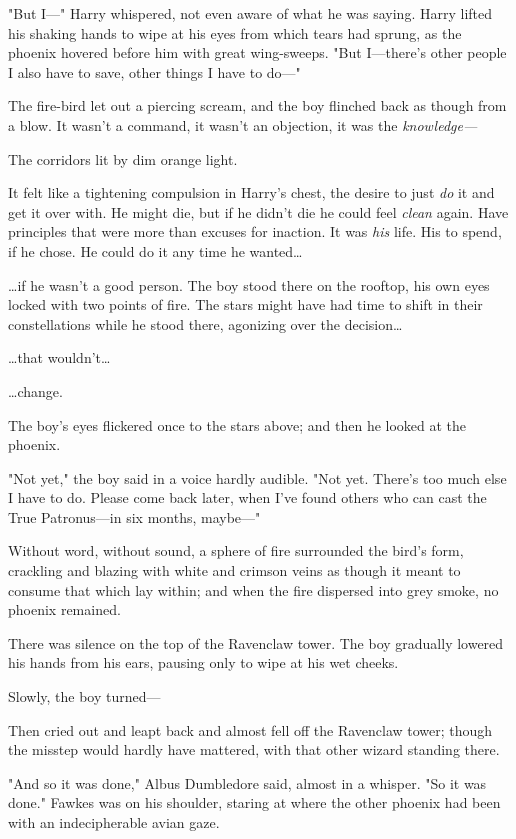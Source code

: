 "But I---" Harry whispered, not even aware of what he was saying. Harry lifted
his shaking hands to wipe at his eyes from which tears had sprung, as the
phoenix hovered before him with great wing-sweeps. "But I---there's other
people I also have to save, other things I have to do---"

The fire-bird let out a piercing scream, and the boy flinched back as though
from a blow. It wasn't a command, it wasn't an objection, it was the
\emph{knowledge---}

The corridors lit by dim orange light.

It felt like a tightening compulsion in Harry's chest, the desire to just
\emph{do} it and get it over with. He might die, but if he didn't die he could
feel \emph{clean} again. Have principles that were more than excuses for
inaction. It was \emph{his} life. His to spend, if he chose. He could do it any
time he wanted{\ldots}

{\ldots}if he wasn't a good person.
\later
The boy stood there on the rooftop, his own eyes locked with two points of
fire. The stars might have had time to shift in their constellations while he
stood there, agonizing over the decision{\ldots}

{\ldots}that wouldn't{\ldots}

{\ldots}change.

The boy's eyes flickered once to the stars above; and then he looked at the
phoenix.

"Not yet," the boy said in a voice hardly audible. "Not yet. There's too much
else I have to do. Please come back later, when I've found others who can cast
the True Patronus---in six months, maybe---"

Without word, without sound, a sphere of fire surrounded the bird's form,
crackling and blazing with white and crimson veins as though it meant to
consume that which lay within; and when the fire dispersed into grey smoke, no
phoenix remained.

There was silence on the top of the Ravenclaw tower. The boy gradually lowered
his hands from his ears, pausing only to wipe at his wet cheeks.

Slowly, the boy turned---

Then cried out and leapt back and almost fell off the Ravenclaw tower; though
the misstep would hardly have mattered, with that other wizard standing there.

"And so it was done," Albus Dumbledore said, almost in a whisper. "So it was
done." Fawkes was on his shoulder, staring at where the other phoenix had been
with an indecipherable avian gaze.

